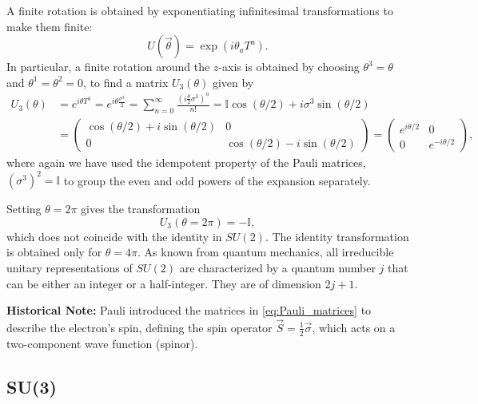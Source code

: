 A finite rotation is obtained by exponentiating infinitesimal transformations to make them finite:
\begin{equation}
    U(\vec{\theta}) = \exp(i \theta_a T^a).
    \label{eq:SU2_exponential_map}
\end{equation}
In particular, a finite rotation around the $z$-axis is obtained by choosing $\theta^3 = \theta$ and $\theta^1 = \theta^2 = 0$, to find a matrix $U_3(\theta)$ given by
\[
    \begin{aligned}
        U_3(\theta) & = e^{i \theta T^3} = e^{i \theta \tfrac{\sigma^3}{2}} = \sum_{n=0}^\infty \frac{(i \tfrac{\theta}{2} \sigma^3)^n}{n!} = \mathbb{I} \cos\left( \theta / 2 \right) + i \sigma^3 \sin\left(\theta / 2 \right) \\
                    & = \begin{pmatrix}
                            \cos(\theta / 2) + i \sin(\theta / 2) & 0                                     \\
                            0                                     & \cos(\theta / 2) - i \sin(\theta / 2)
                        \end{pmatrix} = \begin{pmatrix}
                                            e^{i \theta/2} & 0               \\
                                            0              & e^{-i \theta/2}
                                        \end{pmatrix},
    \end{aligned}
\]
where again we have used the idempotent property of the Pauli matrices, \((\sigma^3)^2 = \mathbb{I}\) to group the even and odd powers of the expansion separately.

Setting $\theta = 2\pi$ gives the transformation
\[
    U_3(\theta = 2\pi) = -\mathbb{I},
\]
which does not coincide with the identity in $SU(2)$. The identity transformation is obtained only for $\theta = 4\pi$. As known from quantum mechanics, all irreducible unitary representations of $SU(2)$ are characterized by a quantum number $j$ that can be either an integer or a half-integer. They are of dimension $2j + 1$.

\textbf{Historical Note:} Pauli introduced the matrices in \eqref{eq:Pauli_matrices} to describe the electron's spin, defining the spin operator $\vec{S} = \frac{1}{2} \vec{\sigma}$, which acts on a two-component wave function (spinor).

\subsection{SU(3)}

